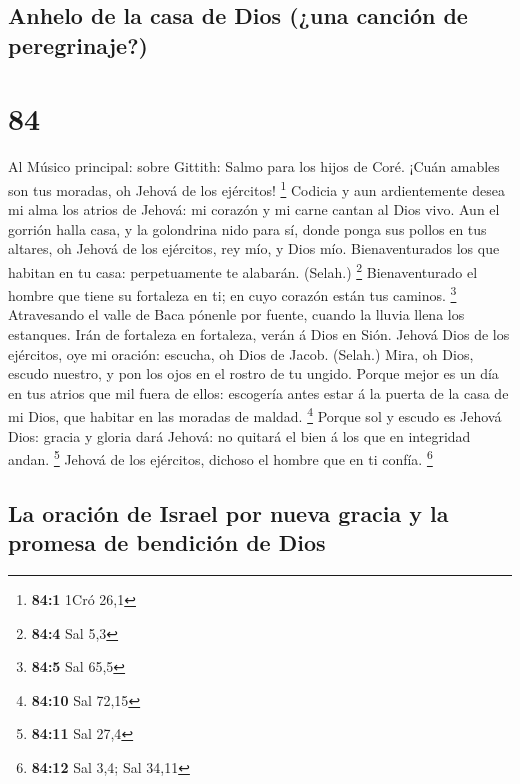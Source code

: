 \hypertarget{anhelo-de-la-casa-de-dios-una-canciuxf3n-de-peregrinaje}{%
\subsection{Anhelo de la casa de Dios (¿una canción de
peregrinaje?)}\label{anhelo-de-la-casa-de-dios-una-canciuxf3n-de-peregrinaje}}

\hypertarget{section-83}{%
\section{84}\label{section-83}}

 Al Músico principal: sobre Gittith: Salmo para los hijos de
Coré. ¡Cuán amables son tus moradas, oh Jehová de los ejércitos!
\footnote{\textbf{84:1} 1Cró 26,1}  Codicia y aun
ardientemente desea mi alma los atrios de Jehová: mi corazón y mi carne
cantan al Dios vivo.  Aun el gorrión halla casa, y la
golondrina nido para sí, donde ponga sus pollos en tus altares, oh
Jehová de los ejércitos, rey mío, y Dios mío. 
Bienaventurados los que habitan en tu casa: perpetuamente te alabarán.
(Selah.) \footnote{\textbf{84:4} Sal 5,3}  Bienaventurado el
hombre que tiene su fortaleza en ti; en cuyo corazón están tus caminos.
\footnote{\textbf{84:5} Sal 65,5}  Atravesando el valle de
Baca pónenle por fuente, cuando la lluvia llena los estanques.
 Irán de fortaleza en fortaleza, verán á Dios en Sión.
 Jehová Dios de los ejércitos, oye mi oración: escucha, oh
Dios de Jacob. (Selah.)  Mira, oh Dios, escudo nuestro, y
pon los ojos en el rostro de tu ungido.  Porque mejor es un
día en tus atrios que mil fuera de ellos: escogería antes estar á la
puerta de la casa de mi Dios, que habitar en las moradas de maldad.
\footnote{\textbf{84:10} Sal 72,15}  Porque sol y escudo es
Jehová Dios: gracia y gloria dará Jehová: no quitará el bien á los que
en integridad andan. \footnote{\textbf{84:11} Sal 27,4} 
Jehová de los ejércitos, dichoso el hombre que en ti confía. \footnote{\textbf{84:12}
  Sal 3,4; Sal 34,11}

\hypertarget{la-oraciuxf3n-de-israel-por-nueva-gracia-y-la-promesa-de-bendiciuxf3n-de-dios}{%
\subsection{La oración de Israel por nueva gracia y la promesa de
bendición de
Dios}\label{la-oraciuxf3n-de-israel-por-nueva-gracia-y-la-promesa-de-bendiciuxf3n-de-dios}}

